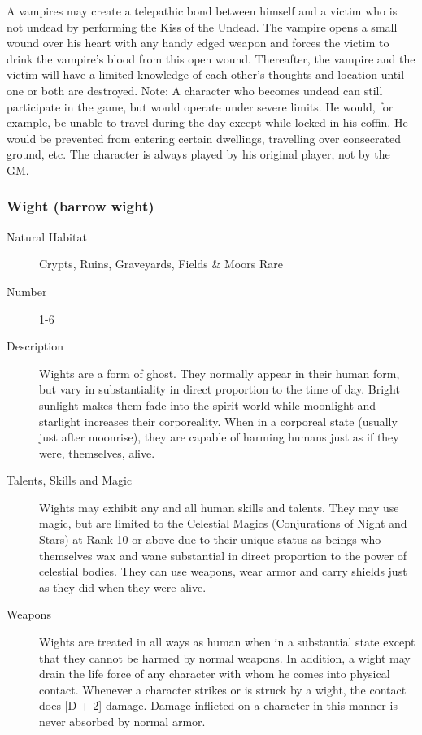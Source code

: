 \begin{multicols}{2}
\begin{description}
A vampires may create a telepathic bond between himself and a victim
who is not undead by performing the Kiss of the Undead.  The vampire
opens a small wound over his heart with any handy edged weapon and
forces the victim to drink the vampire's blood from this open
wound. Thereafter, the vampire and the victim will have a limited
knowledge of each other's thoughts and location until one or both are
destroyed.  Note: A character who becomes undead can still participate
in the game, but would operate under severe limits. He would, for
example, be unable to travel during the day except while locked in his
coffin. He would be prevented from entering certain dwellings,
travelling over consecrated ground, etc. The character is always
played by his original player, not by the GM.

\end{description}

\subsubsection{Wight (barrow wight)}

\begin{description}
\item[Natural Habitat]  Crypts, Ruins, Graveyards, Fields \& Moors Rare

\item[Number] 1-6

\item[Description] Wights are a form of ghost. They normally appear in
their human form, but vary in substantiality in direct proportion to
the time of day. Bright sunlight makes them fade into the spirit world
while moonlight and starlight increases their corporeality. When in a
corporeal state (usually just after moonrise), they are capable of
harming humans just as if they were, themselves, alive.

\item[Talents, Skills and Magic] Wights may exhibit any and all human skills and talents.
They may use magic, but are limited to the Celestial Magics
(Conjurations of Night and Stars) at Rank 10 or above due to their
unique status as beings who themselves wax and wane substantial in
direct proportion to the power of celestial bodies. They can use
weapons, wear armor and carry shields just as they did when they were
alive.

\item[Weapons] Wights are treated in all ways as human when in a
substantial state except that they cannot be harmed by normal
weapons. In addition, a wight may drain the life force of any
character with whom he comes into physical contact. Whenever a
character strikes or is struck by a wight, the contact does [D + 2]
damage. Damage inflicted on a character in this manner is never
absorbed by normal armor.


\end{description}
\end{multicols}
